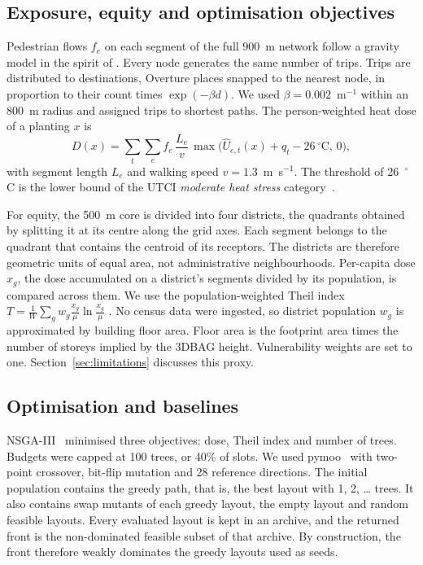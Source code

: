 \documentclass[preprint,12pt,authoryear]{elsarticle}
\newcommand{\degC}{\ensuremath{^\circ}C}
\begin{document}
\subsection{Exposure, equity and optimisation objectives}\label{sec:objectives}

Pedestrian flows $f_e$ on each segment of the full 900~m network follow a gravity model in the spirit of \citet{sevtsuk2021}. Every node generates the same number of trips. Trips are distributed to destinations, Overture places snapped to the nearest node, in proportion to their count times $\exp(-\beta d)$. We used $\beta = 0.002$~m$^{-1}$ within an 800~m radius and assigned trips to shortest paths. The person-weighted heat dose of a planting $x$ is
\begin{equation}
  D(x) = \sum_{t}\sum_{e} f_e\,\frac{L_e}{v}\,\max\big(\hat U_{e,t}(x) + q_t - 26\,^\circ\mathrm{C},\,0\big),
\end{equation}
with segment length $L_e$ and walking speed $v = 1.3$~m~s$^{-1}$. The threshold of 26~\degC{} is the lower bound of the UTCI \emph{moderate heat stress} category~\citep{brode2012}.

For equity, the 500~m core is divided into four districts, the quadrants obtained by splitting it at its centre along the grid axes. Each segment belongs to the quadrant that contains the centroid of its receptors. The districts are therefore geometric units of equal area, not administrative neighbourhoods. Per-capita dose $x_g$, the dose accumulated on a district's segments divided by its population, is compared across them. We use the population-weighted Theil index $T = \frac{1}{W}\sum_g w_g \frac{x_g}{\mu}\ln\frac{x_g}{\mu}$ \citep{shorrocks1980}. No census data were ingested, so district population $w_g$ is approximated by building floor area. Floor area is the footprint area times the number of storeys implied by the 3DBAG height. Vulnerability weights are set to one. Section~\ref{sec:limitations} discusses this proxy.

\subsection{Optimisation and baselines}\label{sec:optim}

NSGA-III~\citep{deb2014} minimised three objectives: dose, Theil index and number of trees. Budgets were capped at 100 trees, or 40\% of slots. We used pymoo~\citep{blank2020} with two-point crossover, bit-flip mutation and 28 reference directions. The initial population contains the greedy path, that is, the best layout with 1, 2, \ldots{} trees. It also contains swap mutants of each greedy layout, the empty layout and random feasible layouts. Every evaluated layout is kept in an archive, and the returned front is the non-dominated feasible subset of that archive. By construction, the front therefore weakly dominates the greedy layouts used as seeds.
\end{document}

